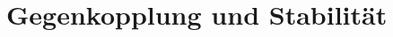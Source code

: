 
\newcommand{\titleinfo}{Regelungstechnik 2 - Formelsammlung}
\newcommand{\authorinfo}{F. Braun, L. Schmid, U. Giger, R. Koller, S.
Arnold, S. Ferretti}
\newcommand{\versioninfo}{$Revision: 1044 $ - powered by \LaTeX}

%


 
 

	
\section{Gegenkopplung und Stabilität }

	

